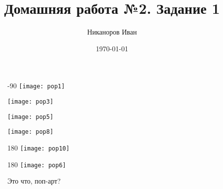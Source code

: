 \documentclass[12pt, a4paper]{article}
\author{Никаноров Иван}
\title{Домашняя работа №2. Задание 1}
\date {\today}
\begin{document}
\maketitle

\newpage

\begin{figure} [H]
 \begin{minipage}[h!]{0.32\linewidth}
  \begin{turn} {-90}
  \texttt{[image: pop1]}
  \end{turn}
 \end{minipage}
 \hfill
 \begin{minipage}[h!]{0.32\linewidth}
  \texttt{[image: pop3]}
 \end{minipage}
 \hfill
 \begin{minipage}[h!]{0.32\linewidth}
  \texttt{[image: pop5]}
 \end{minipage}
 \vfill
  \begin{minipage}[h!]{0.32\linewidth}
  \texttt{[image: pop8]}
 \end{minipage}
 \hfill
  \begin{minipage}[h!]{0.32\linewidth}
   \begin{turn} {180}
   \texttt{[image: pop10]}
   \end{turn}
 \end{minipage}
 \hfill
  \begin{minipage}[h!]{0.32\linewidth}
   \begin{turn} {180}
   \texttt{[image: pop6]}
   \end{turn}
 \end{minipage}
 \caption{Это что, поп-арт?}
\end{figure}
\end{document}
